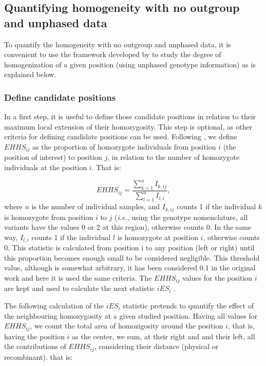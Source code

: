 \documentclass[a4paper,11pt]{article}
\begin{document}
\subsection{Quantifying homogeneity with no outgroup and unphased data}
To quantify the homogeneity with no outgroup and unphased data, it is convenient to use the framework developed by \cite{Tang:2007aa} to study the degree of homogenization of a given position (using unphased genotype information) as is explained below.

\subsubsection{Define candidate positions}
 In a first step, it is useful to define those candidate positions in relation to their maximum local extension of their homozygosity. This step is optional, as other criteria for defining candidate positions can be used. Following \citep{Tang:2007aa}, we define $EHHS_{ij}$ as the proportion of homozygote individuals from position $i$ (the position of interest) to position $j$, in relation to the number of homozygote individuals at the position $i$. That is:
 
 \begin{equation}
 EHHS_{ij} = \frac{\sum_{k=1}^{n}I_{k,ij}}{\sum_{l=1}^{n}I_{l,i}},
 \end{equation}
where $n$ is the number of individual samples, and $I_{k,ij}$ counts 1 if the individual $k$ is homozygote from position $i$ to $j$ (\textit{i.e.}, using the genotype nomenclature, all variants have the values 0 or 2 at this region), otherwise counts 0. In the same way, $I_{l,i}$ counts 1 if the individual $l$ is homozygote at position $i$, otherwise counts 0. This statistic is calculated from position i to any position (left or right) until this proportion becomes enough small to be considered negligible. This threshold value, although is somewhat arbitrary, it has been considered 0.1 in the original work \citep{Tang:2007aa} and here it is used the same criteria. The $EHHS_{ij}$ values for the position $i$ are kept and used to calculate the next statistic $iES_i$ \citep{Tang:2007aa}.

The following calculation of the $iES_i$ statistic pretends to quantify the effect of the neighbouring homozygosity at a given studied position. Having all values for $EHHS_{ij}$, we count the total area of homozigosity around the position $i$, that is, having the position $i$ as the center, we sum, at their right and and their left, all the contributions of $EHHS_{ij}$, considering their distance (physical or recombinant). that is: 
\end{document}
